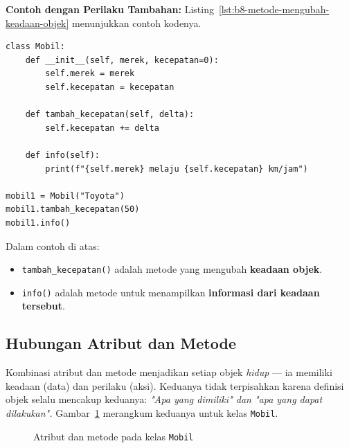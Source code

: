 \noindent\textbf{Contoh dengan Perilaku Tambahan:}
Listing~\ref{lst:b8-metode-mengubah-keadaan-objek} menunjukkan contoh kodenya.

\begin{lstlisting}[style=PythonStyle, caption={Metode yang Mengubah Keadaan Objek}, label={lst:b8-metode-mengubah-keadaan-objek}]
class Mobil:
    def __init__(self, merek, kecepatan=0):
        self.merek = merek
        self.kecepatan = kecepatan

    def tambah_kecepatan(self, delta):
        self.kecepatan += delta

    def info(self):
        print(f"{self.merek} melaju {self.kecepatan} km/jam")

mobil1 = Mobil("Toyota")
mobil1.tambah_kecepatan(50)
mobil1.info()
\end{lstlisting}

Dalam contoh di atas:
\begin{itemize}
    \item \texttt{tambah_kecepatan()} adalah metode yang mengubah \textbf{keadaan objek}.
    \item \texttt{info()} adalah metode untuk menampilkan \textbf{informasi dari keadaan tersebut}.
\end{itemize}

\subsection*{Hubungan Atribut dan Metode}
Kombinasi atribut dan metode menjadikan setiap objek \emph{hidup} — ia memiliki keadaan (data) dan perilaku (aksi).  
Keduanya tidak terpisahkan karena definisi objek selalu mencakup keduanya:  
\emph{"Apa yang dimiliki" dan "apa yang dapat dilakukan".} Gambar~\ref{fig:b8-atribut-metode} merangkum keduanya untuk kelas \texttt{Mobil}.

\begin{figure}[H]
  \centering
  \caption{Atribut dan metode pada kelas \texttt{Mobil}}
  \label{fig:b8-atribut-metode}
\end{figure}


